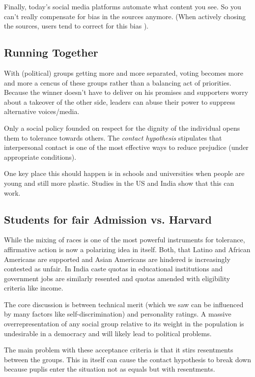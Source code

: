 \documentclass[a4paper, twocolumn]{article}
\begin{document}
Finally, today's social media platforms automate what content you see. So you can't really compensate for bias in the sources anymore. (When actively chosing the sources, users tend to correct for this bias \cite{known-source-slant}).

\subsection{Running Together}
With (political) groups getting more and more separated, voting becomes more and more a cencus of these groups rather than a balancing act of priorities. Because the winner doesn't have to deliver on his promises and supporters worry about a takeover of the other side, leaders can abuse their power to suppress alternative voices/media.

Only a social policy founded on respect for the dignity of the individual opens them to tolerance towards others. The \emph{contact hypothesis} \cite{contact-hypothesis} stipulates that interpersonal contact is one of the most effective ways to reduce prejudice (under appropriate conditions).

One key place this should happen is in schools and universities when people are young and still more plastic. Studies in the US \cite{us-contact-hypothesis} and India \cite{india-contact-hypothesis} show that this can work.

\subsection{Students for fair Admission vs. Harvard}
While the mixing of races is one of the most powerful instruments for tolerance, affirmative action is now a polarizing idea in itself. Both, that Latino and African Americans are supported and Asian Americans are hindered is increasingly contested as unfair. In India caste quotas in educational institutions and government jobs are similarly resented and quotas amended with eligibility criteria like income.

The core discussion is between technical merit (which we saw can be influenced by many factors like self-discrimination) and personality ratings. A massive overrepresentation of any social group relative to its weight in the population is undesirable in a democracy and will likely lead to political problems.

The main problem with these acceptance criteria is that it stirs resentments between the groups. This in itself can cause the contact hypothesis to break down because puplis enter the situation not as equals but with resentments. 
\end{document}
